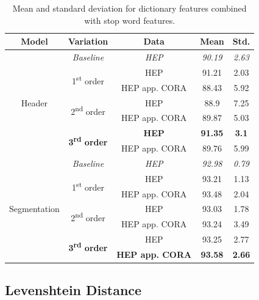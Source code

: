 \begin{table}[h]
\begin{center}
\begin{tabular}{|c|c|c|c|c|}
\hline
Model & Variation & Data & Mean & Std.\\
\hline
\multirow{7}{*}{Header} & \emph{Baseline} & \emph{HEP} & \emph{90.19} & \emph{2.63} \\\cline{2-5}
& \multirow{2}{*}{1\textsuperscript{st} order} & HEP & 91.21 & 2.03\\\cline{3-5}
& & HEP app. CORA & 88.43 & 5.92\\\cline{2-5}
& \multirow{2}{*}{2\textsuperscript{nd} order} & HEP & 88.9 & 7.25\\\cline{3-5}
& & HEP app. CORA & 89.87 & 5.03\\\cline{2-5}
& \multirow{2}{*}{\textbf{3\textsuperscript{rd} order}} & \textbf{HEP} & \textbf{91.35} & \textbf{3.1}\\\cline{3-5}
& & HEP app. CORA & 89.76 & 5.99\\ \hline
\multirow{7}{*}{Segmentation} & \emph{Baseline} & \emph{HEP} & \emph{92.98} & \emph{0.79} \\\cline{2-5}
& \multirow{2}{*}{1\textsuperscript{st} order} & HEP & 93.21 & 1.13\\\cline{3-5}
& & HEP app. CORA & 93.48 & 2.04\\\cline{2-5}
& \multirow{2}{*}{2\textsuperscript{nd} order} & HEP & 93.03 & 1.78\\\cline{3-5}
& & HEP app. CORA & 93.24 & 3.49\\\cline{2-5}
& \multirow{2}{*}{\textbf{3\textsuperscript{rd} order}} & HEP & 93.25 & 2.77\\\cline{3-5}
& & \textbf{HEP app. CORA} & \textbf{93.58} & \textbf{2.66}\\
\hline
\end{tabular}
\caption{Mean and standard deviation for dictionary features combined with stop word features.}
\label{table:dictsstopsresults}
\end{center}
\end{table}

\subsection{Levenshtein Distance}

